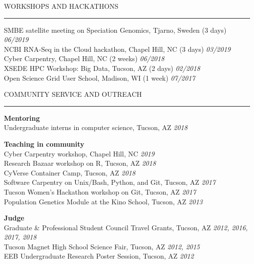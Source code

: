 \documentclass{resume} %
\renewenvironment{rSection}[1]{
\sectionskip
\textcolor{RoyalPurple}{\MakeUppercase{#1}}
\sectionlineskip
\hrule
\begin{list}{}{
\setlength{\leftmargin}{1.5em}
}
\item[]
}{
\end{list}
}
\begin{document}

\begin{rSection}{Workshops and Hackathons}

SMBE satellite meeting on Speciation Genomics, Tjarno, Sweden (3 days) \hfill{\em 06/2019}\\
NCBI RNA-Seq in the Cloud hackathon, Chapel Hill, NC (3 days) \hfill {\em 03/2019}\\
Cyber Carpentry, Chapel Hill, NC (2 weeks) \hfill {\em 06/2018}\\
XSEDE HPC Workshop: Big Data, Tucson, AZ (2 days) \hfill {\em 02/2018}\\
Open Science Grid User School, Madison, WI (1 week) \hfill {\em 07/2017}

\end{rSection}




\begin{rSection}{Community Service and Outreach}

\textbf{Mentoring}\\
Undergraduate interns in computer science, Tucson, AZ \hfill {\em 2018}

\textbf{Teaching in community}\\
Cyber Carpentry workshop, Chapel Hill, NC \hfill {\em 2019}\\
Research Bazaar workshop on R, Tucson, AZ \hfill {\em 2018}\\
CyVerse Container Camp, Tucson, AZ \hfill {\em 2018}\\
Software Carpentry on Unix/Bash, Python, and Git, Tucson, AZ \hfill {\em 2017}\\
Tucson Women’s Hackathon workshop on Git, Tucson, AZ \hfill {\em 2017}\\
Population Genetics Module at the Kino School, Tucson, AZ \hfill {\em 2013}

\textbf{Judge}\\
Graduate \& Professional Student Council Travel Grants, Tucson, AZ \hfill {\em 2012, 2016, 2017, 2018}\\
Tucson Magnet High School Science Fair, Tucson, AZ \hfill {\em 2012, 2015}\\
EEB Undergraduate Research Poster Session, Tucson, AZ \hfill {\em 2012}

\end{rSection}
\end{document}
